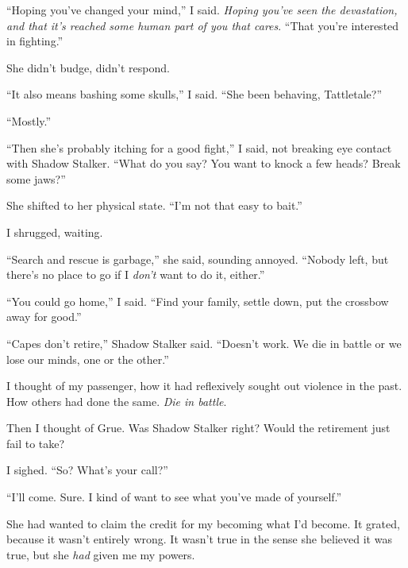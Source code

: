 ``Hoping you've changed your mind,'' I said.  \emph{Hoping you've seen the devastation, and that it's reached some human part of you that cares}.  ``That you're interested in fighting.''



She didn't budge, didn't respond.



``It also means bashing some skulls,'' I said.  ``She been behaving, Tattletale?''



``Mostly.''



``Then she's probably itching for a good fight,'' I said, not breaking eye contact with Shadow Stalker.  ``What do you say?  You want to knock a few heads?  Break some jaws?''



She shifted to her physical state.  ``I'm not that easy to bait.''



I shrugged, waiting.



``Search and rescue is garbage,'' she said, sounding annoyed.  ``Nobody left, but there's no place to go if I \emph{don't} want to do it, either.''



``You could go home,'' I said.  ``Find your family, settle down, put the crossbow away for good.''



``Capes don't retire,'' Shadow Stalker said.  ``Doesn't work.  We die in battle or we lose our minds, one or the other.''



I thought of my passenger, how it had reflexively sought out violence in the past.  How others had done the same.  \emph{Die in battle}.



Then I thought of Grue.  Was Shadow Stalker right?  Would the retirement just fail to take?



I sighed.  ``So?  What's your call?''



``I'll come.  Sure.  I kind of want to see what you've made of yourself.''



She had wanted to claim the credit for my becoming what I'd become.  It grated, because it wasn't entirely wrong.  It wasn't true in the sense she believed it was true, but she \emph{had} given me my powers.



